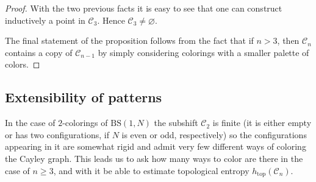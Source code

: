 \documentclass[letterpaper,10pt]{amsart}
\theoremstyle{plain}
\newcommand{\BS}[1][N]{\mathrm{BS}(1,#1)}
\def\htop{h_{\mathrm{top}}}
\begin{document}
\begin{proof}
	
	With the two previous facts it is easy to see that one can construct inductively a point in $\mathcal{C}_3$. Hence $\mathcal{C}_3\neq \varnothing$.


	The final statement of the proposition follows from the fact that if $n> 3$, then $\mathcal{C}_n$ contains a copy of $\mathcal{C}_{n-1}$ by simply considering colorings with a smaller palette of colors.
\end{proof}


	\subsection{Extensibility of patterns}\label{subsection:extensibility_patterns}
	In the case of $2$-colorings of $\BS$ the subshift $\mathcal{C}_2$ is finite (it is either empty or has two configurations, if $N$ is even or odd, respectively) so the configurations appearing in it are somewhat rigid and admit very few different ways of coloring the Cayley graph. This leads us to ask how many ways to color are there in the case of $n\ge 3$, and with it be able to estimate topological entropy $\htop(\mathcal{C}_n)$.
	
\end{document}
